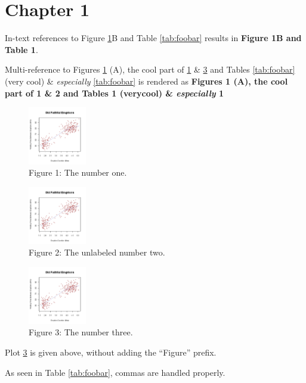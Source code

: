 \section{Chapter 1}\label{chapter-1}

In-text references to Figure \ref{fig:1}B and Table \ref{tab:foobar}
results in \textbf{Figure 1B and Table 1}.

Multi-reference to Figures \ref{fig:1} (A), the cool part of
\ref{fig:1} \& \ref{fig:three} and Tables \ref{tab:foobar} (very
cool) \& \emph{especially} \ref{tab:foobar} is rendered as
\textbf{Figures 1 (A), the cool part of 1 \& 2 and Tables 1 (verycool)
\& \emph{especially} 1}

\begin{figure}
\centering
\includegraphics[width=1in,height=\textheight]{img/fig-1.png}
\caption{Figure 1: The number one.}\label{fig:1}
\end{figure}

\begin{figure}
\centering
\includegraphics[width=1in,height=\textheight]{img/fig-1.png}
\caption{Figure 2: The unlabeled number two.}\label{fig:}
\end{figure}

\begin{figure}
\centering
\includegraphics[width=1in,height=\textheight]{img/fig-1.png}
\caption{Figure 3: The number three.}\label{fig:three}
\end{figure}

Plot \ref{fig:three} is given above, without adding the ``Figure''
prefix.

As seen in Table \ref{tab:foobar}, commas are handled properly.


